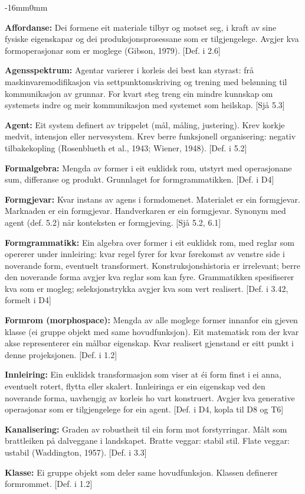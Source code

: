 \documentclass[10pt,oneside]{book}
\newenvironment{ordliste}{%
  \begingroup\small\setlength{\parskip}{2pt plus 0.6pt}%
  \linespread{0.97}\selectfont
}{%
  \endgroup
}
\newcommand{\ordlisteentry}[2]{%
  \par\addvspace{2.5pt}%
  \noindent\textbf{#1:} #2\par%
}
\newenvironment{widebody}{%
  \begin{adjustwidth}{-16mm}{0mm}%
}{%
  \end{adjustwidth}%
}
\begin{document}
\begin{widebody}
\begin{ordliste}
\ordlisteentry{Affordanse}{Dei formene eit materiale tilbyr og motset seg, i kraft av sine fysiske eigenskapar og dei produksjonsprosessane som er tilgjengelege. Avgjer kva formoperasjonar som er moglege (Gibson, 1979). [Def. i 2.6]}
\ordlisteentry{Agensspektrum}{Agentar varierer i korleis dei best kan styrast: frå maskinvaremodifikasjon via settpunktomskriving og trening med belønning til kommunikasjon av grunnar. For kvart steg treng ein mindre kunnskap om systemets indre og meir kommunikasjon med systemet som heilskap. [Sjå 5.3]}
\ordlisteentry{Agent}{Eit system definert av trippelet (mål, måling, justering). Krev korkje medvit, intensjon eller nervesystem. Krev berre funksjonell organisering: negativ tilbakekopling (Rosenblueth et al., 1943; Wiener, 1948). [Def. i 5.2]}
\ordlisteentry{Formalgebra}{Mengda av former i eit euklidsk rom, utstyrt med operasjonane sum, differanse og produkt. Grunnlaget for formgrammatikken. [Def. i D4]}
\ordlisteentry{Formgjevar}{Kvar instans av agens i formdomenet. Materialet er ein formgjevar. Marknaden er ein formgjevar. Handverkaren er ein formgjevar. Synonym med agent (def. 5.2) når konteksten er formgjeving. [Sjå 5.2, 6.1]}
\ordlisteentry{Formgrammatikk}{Ein algebra over former i eit euklidsk rom, med reglar som opererer under innleiring: kvar regel fyrer for kvar førekomst av venstre side i noverande form, eventuelt transformert. Konstruksjonshistoria er irrelevant; berre den noverande forma avgjer kva reglar som kan fyre. Grammatikken spesifiserer kva som er mogleg; seleksjonstrykka avgjer kva som vert realisert. [Def. i 3.42, formelt i D4]}
\ordlisteentry{Formrom (morphospace)}{Mengda av alle moglege former innanfor ein gjeven klasse (ei gruppe objekt med same hovudfunksjon). Eit matematisk rom der kvar akse representerer ein målbar eigenskap. Kvar realisert gjenstand er eitt punkt i denne projeksjonen. [Def. i 1.2]}
\ordlisteentry{Innleiring}{Ein euklidsk transformasjon som viser at éi form finst i ei anna, eventuelt rotert, flytta eller skalert. Innleiringa er ein eigenskap ved den noverande forma, uavhengig av korleis ho vart konstruert. Avgjer kva generative operasjonar som er tilgjengelege for ein agent. [Def. i D4, kopla til D8 og T6]}
\ordlisteentry{Kanalisering}{Graden av robustheit til ein form mot forstyrringar. Målt som brattleiken på dalveggane i landskapet. Bratte veggar: stabil stil. Flate veggar: ustabil (Waddington, 1957). [Def. i 3.3]}
\ordlisteentry{Klasse}{Ei gruppe objekt som deler same hovudfunksjon. Klassen definerer formrommet. [Def. i 1.2]}

\end{ordliste}
\end{widebody}
\end{document}

